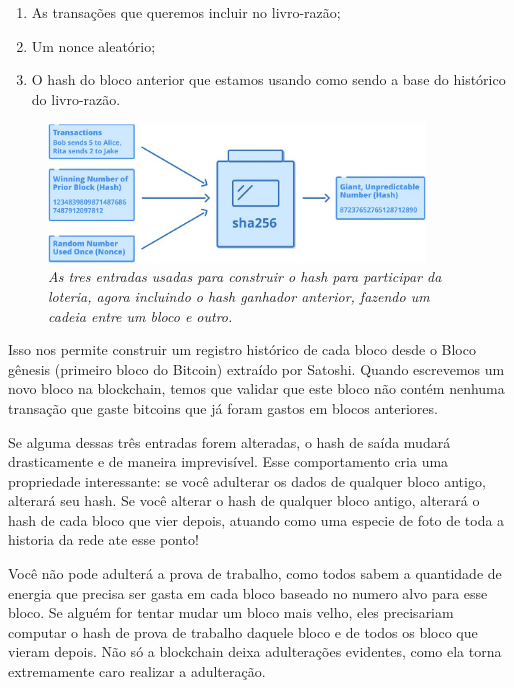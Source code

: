\begin{samepage}
\begin{enumerate}
\item As transações que queremos incluir no livro-razão;
\item Um nonce aleatório;
\item O hash do bloco anterior que estamos usando como sendo a base do histórico do livro-razão.
\end{enumerate}
\end{samepage}

\begin{figure}[ht]
  \centering
  \includegraphics[width=10cm]{imagens/capitulo6/capitulo6Sha256.png}
  \caption*{\textit{As tres entradas usadas para construir o hash para participar da loteria, agora incluindo o hash ganhador anterior, fazendo um cadeia entre um bloco e outro.}}
\end{figure}

Isso nos permite construir um registro histórico de cada bloco desde o Bloco gênesis (primeiro bloco do Bitcoin) extraído por Satoshi.
Quando escrevemos um novo bloco na blockchain, temos que validar que este bloco não contém nenhuma transação que gaste bitcoins que já foram gastos em blocos anteriores.

Se alguma dessas três entradas forem alteradas, o hash de saída mudará drasticamente e de maneira imprevisível. Esse comportamento cria uma propriedade interessante: se você adulterar os dados de qualquer bloco antigo, alterará seu hash. Se você alterar o hash de qualquer bloco antigo, alterará o hash de cada bloco que vier depois, atuando como uma especie de foto de toda a historia da rede ate esse ponto!


Você não pode adulterá a prova de trabalho, como todos sabem a quantidade de energia que precisa ser gasta em cada bloco baseado no numero alvo para esse bloco. Se alguém for tentar mudar um bloco mais velho, eles precisariam computar o hash de prova de trabalho daquele bloco e de todos os bloco que vieram depois. Não só a blockchain deixa adulterações evidentes, como ela torna extremamente caro realizar a adulteração.

